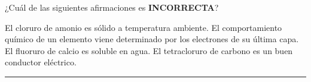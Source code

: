 \documentclass[a4paper,addpoints,14pt]{exam}
\newcommand{\halmos}{\vspace*{-4mm}
	
					\begin{flushright}
						\rule{1mm}{2.5mm} 
					\end{flushright}\vspace*{-4mm}
						
					  }
\renewcommand{\qed}{\halmos}
\begin{document}
\begin{questions}
\question[1] ¿Cuál de las siguientes afirmaciones es {\small \textbf{INCORRECTA}}?
		\begin{checkboxes} 
		\choice El cloruro de amonio es sólido a temperatura ambiente.
		\choice El comportamiento químico de un elemento viene determinado por los electrones de su última capa.
		\choice El fluoruro de calcio es soluble en agua.
		\CorrectChoice El tetracloruro de carbono es un buen conductor eléctrico. 
		\end{checkboxes}
\qed

%
%
%
	



\end{questions}
\end{document}
